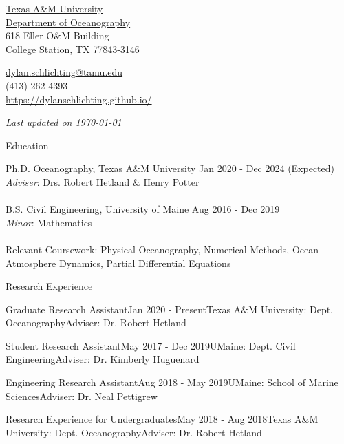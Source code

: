 \documentclass{resume} %
\newcommand{\updateinfo}[1][\today]{\par\vfill{\textit{Last updated on #1}}}
\begin{document}
\begin{minipage}[ht]{0.35\textwidth}
  \href{http://www.tamu.edu/}{Texas A\&M University} \\
  \href{http://ocean.tamu.edu/}{Department of Oceanography} \\
  618 Eller O$\&$M Building  \\
  College Station, TX 77843-3146
\end{minipage}
\begin{minipage}[ht]{0.6\textwidth}
  \href{mailto:dylan.schlichting@tamu.edu}{dylan.schlichting@tamu.edu} \\
  (413) 262-4393\\
  \url{https://dylanschlichting.github.io/}
  \updateinfo
\end{minipage}
\vspace{-65 pt}

\vspace{60pt}
\begin{rSection}{Education}

Ph.D. Oceanography, Texas A$\&$M 
University \hfill {Jan 2020 - Dec 2024 (Expected)
}
\\
\textit{Adviser}: Drs. Robert Hetland $\&$ Henry Potter
\\
\\
B.S. Civil Engineering, University of Maine \hfill {Aug 2016 - Dec 2019}
\\ 
{\textit{Minor}:} Mathematics
\\
\\
Relevant Coursework: Physical Oceanography, Numerical Methods, Ocean-Atmosphere Dynamics, Partial Differential Equations 
\end{rSection}

\begin{rSection}{Research Experience}
\begin{rSubsection}{Graduate Research Assistant}{Jan 2020 - Present}{Texas A$\&$M University: Dept. Oceanography}{Adviser: Dr. Robert Hetland} 
\end{rSubsection}    

\begin{rSubsection}{Student Research Assistant}{May 2017 - Dec 2019}{UMaine: Dept. Civil Engineering}{Adviser: Dr. Kimberly Huguenard} 
\end{rSubsection}

\begin{rSubsection}{Engineering Research Assistant}{Aug 2018 - May 2019}{UMaine: School of Marine Sciences}{Adviser: Dr. Neal Pettigrew}
\end{rSubsection}

\begin{rSubsection}{Research Experience for Undergraduates}{May 2018 - Aug 2018}{Texas A$\&$M University: Dept. Oceanography}{Adviser: Dr. Robert Hetland} 
\end{rSubsection} 
\end{rSection} 
\vspace{-3pt}
\end{document}
